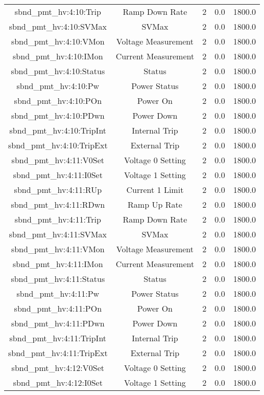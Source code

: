 \begin{center}
\begin{longtable}{c | c c c c }
sbnd\_pmt\_hv:4:10:Trip & Ramp Down Rate & 2 & 0.0 & 1800.0\\ 
sbnd\_pmt\_hv:4:10:SVMax & SVMax & 2 & 0.0 & 1800.0\\ 
sbnd\_pmt\_hv:4:10:VMon & Voltage Measurement & 2 & 0.0 & 1800.0\\ 
sbnd\_pmt\_hv:4:10:IMon & Current Measurement & 2 & 0.0 & 1800.0\\ 
sbnd\_pmt\_hv:4:10:Status & Status & 2 & 0.0 & 1800.0\\ 
sbnd\_pmt\_hv:4:10:Pw & Power Status & 2 & 0.0 & 1800.0\\ 
sbnd\_pmt\_hv:4:10:POn & Power On & 2 & 0.0 & 1800.0\\ 
sbnd\_pmt\_hv:4:10:PDwn & Power Down & 2 & 0.0 & 1800.0\\ 
sbnd\_pmt\_hv:4:10:TripInt & Internal Trip & 2 & 0.0 & 1800.0\\ 
sbnd\_pmt\_hv:4:10:TripExt & External Trip & 2 & 0.0 & 1800.0\\ 
sbnd\_pmt\_hv:4:11:V0Set & Voltage 0 Setting & 2 & 0.0 & 1800.0\\ 
sbnd\_pmt\_hv:4:11:I0Set & Voltage 1 Setting & 2 & 0.0 & 1800.0\\ 
sbnd\_pmt\_hv:4:11:RUp & Current 1 Limit & 2 & 0.0 & 1800.0\\ 
sbnd\_pmt\_hv:4:11:RDwn & Ramp Up Rate & 2 & 0.0 & 1800.0\\ 
sbnd\_pmt\_hv:4:11:Trip & Ramp Down Rate & 2 & 0.0 & 1800.0\\ 
sbnd\_pmt\_hv:4:11:SVMax & SVMax & 2 & 0.0 & 1800.0\\ 
sbnd\_pmt\_hv:4:11:VMon & Voltage Measurement & 2 & 0.0 & 1800.0\\ 
sbnd\_pmt\_hv:4:11:IMon & Current Measurement & 2 & 0.0 & 1800.0\\ 
sbnd\_pmt\_hv:4:11:Status & Status & 2 & 0.0 & 1800.0\\ 
sbnd\_pmt\_hv:4:11:Pw & Power Status & 2 & 0.0 & 1800.0\\ 
sbnd\_pmt\_hv:4:11:POn & Power On & 2 & 0.0 & 1800.0\\ 
sbnd\_pmt\_hv:4:11:PDwn & Power Down & 2 & 0.0 & 1800.0\\ 
sbnd\_pmt\_hv:4:11:TripInt & Internal Trip & 2 & 0.0 & 1800.0\\ 
sbnd\_pmt\_hv:4:11:TripExt & External Trip & 2 & 0.0 & 1800.0\\ 
sbnd\_pmt\_hv:4:12:V0Set & Voltage 0 Setting & 2 & 0.0 & 1800.0\\ 
sbnd\_pmt\_hv:4:12:I0Set & Voltage 1 Setting & 2 & 0.0 & 1800.0\\ 

\end{longtable}
\end{center}
